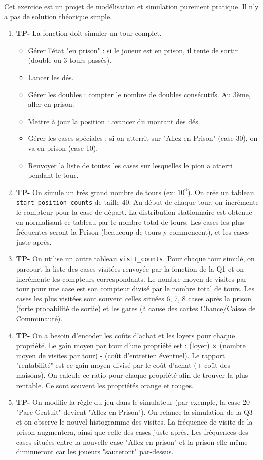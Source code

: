 \documentclass[]{exercices}
\begin{document}
\begin{solution}
Cet exercice est un projet de modélisation et simulation purement pratique. Il n'y a pas de solution théorique simple.
\begin{enumerate}
    \item \textbf{TP-} La fonction doit simuler un tour complet.
    \begin{itemize}
        \item Gérer l'état "en prison" : si le joueur est en prison, il tente de sortir (double ou 3 tours passés).
        \item Lancer les dés.
        \item Gérer les doubles : compter le nombre de doubles consécutifs. Au 3ème, aller en prison.
        \item Mettre à jour la position : avancer du montant des dés.
        \item Gérer les cases spéciales : si on atterrit sur "Allez en Prison" (case 30), on va en prison (case 10).
        \item Renvoyer la liste de toutes les cases sur lesquelles le pion a atterri pendant le tour.
    \end{itemize}
\item \textbf{TP-} On simule un très grand nombre de tours (ex: $10^6$). On crée un tableau \texttt{start\_position\_counts} de taille 40. Au début de chaque tour, on incrémente le compteur pour la case de départ. La distribution stationnaire est obtenue en normalisant ce tableau par le nombre total de tours. Les cases les plus fréquentes seront la Prison (beaucoup de tours y commencent), et les cases juste après.
\item \textbf{TP-} On utilise un autre tableau \texttt{visit\_counts}. Pour chaque tour simulé, on parcourt la liste des cases visitées renvoyée par la fonction de la Q1 et on incrémente les compteurs correspondants. Le nombre moyen de visites par tour pour une case est son compteur divisé par le nombre total de tours. Les cases les plus visitées sont souvent celles situées 6, 7, 8 cases après la prison (forte probabilité de sortie) et les gares (à cause des cartes Chance/Caisse de Communauté).
    \item \textbf{TP-} On a besoin d'encoder les coûts d'achat et les loyers pour chaque propriété. Le gain moyen par tour d'une propriété est : (loyer) $\times$ (nombre moyen de visites par tour) - (coût d'entretien éventuel). Le rapport "rentabilité" est ce gain moyen divisé par le coût d'achat (+ coût des maisons). On calcule ce ratio pour chaque propriété afin de trouver la plus rentable. Ce sont souvent les propriétés orange et rouges.
    \item \textbf{TP-} On modifie la règle du jeu dans le simulateur (par exemple, la case 20 "Parc Gratuit" devient "Allez en Prison"). On relance la simulation de la Q3 et on observe le nouvel histogramme des visites. La fréquence de visite de la prison augmentera, ainsi que celle des cases juste après. Les fréquences des cases situées entre la nouvelle case "Allez en prison" et la prison elle-même diminueront car les joueurs "sauteront" par-dessus.
\end{enumerate}
\end{solution}
\end{document}

